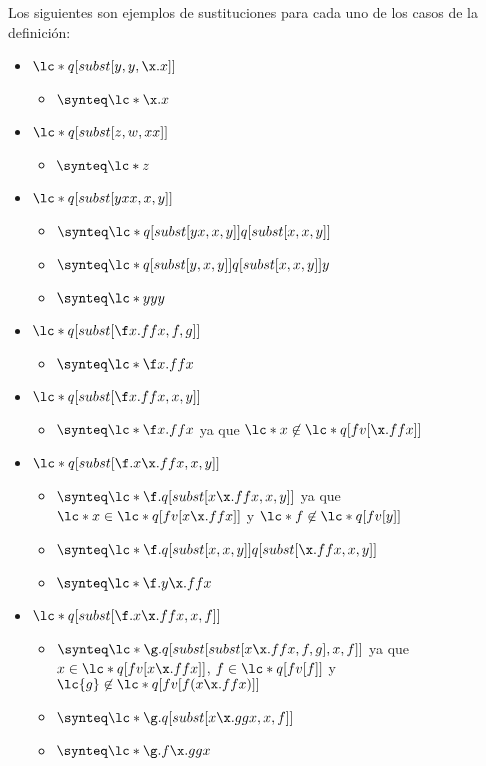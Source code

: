 Los siguientes son ejemplos de sustituciones para cada uno de los casos de la
definición:

\begin{itemize}
\item \(\lc*{q[subst[y,y,\x.x]]}\)
  \begin{itemize}
  \item \(\synteq \lc*{\x.x}\)
  \end{itemize}
\item \(\lc*{q[subst[z,w,x x]]}\)
  \begin{itemize}
  \item \(\synteq \lc*{z}\)
  \end{itemize}
\item \(\lc*{q[subst[y x x, x, y]]}\)
  \begin{itemize}
  \item \(\synteq \lc*{q[subst[y x, x, y]] q[subst[x, x, y]]}\)
  \item \(\synteq \lc*{q[subst[y, x, y]] q[subst[x, x, y]] y}\)
  \item \(\synteq \lc*{y y y}\)
  \end{itemize}
\item \(\lc*{q[subst[\f x.f f x, f, g]]}\)
  \begin{itemize}
  \item \(\synteq \lc*{\f x.f f x}\)
  \end{itemize}
\item \(\lc*{q[subst[\f x.f f x, x, y]]}\)
  \begin{itemize}
  \item \(\synteq \lc*{\f x.f f x}\) ya que \(\lc*{x} \not\in \lc*{q[fv[\x.f f x]]}\)
  \end{itemize}
\item \(\lc*{q[subst[\f.x\x.f f x, x, y]]}\)
  \begin{itemize}
  \item \(\synteq \lc*{\f.q[subst[x\x.f f x, x, y]]}\) ya que
    \(\lc*{x}\in\lc*{q[fv[x\x.f f x]]}\) y \(\lc*{f}\not\in \lc*{q[fv[y]]}\)
  \item \(\synteq \lc*{\f.q[subst[x,x,y]] q[subst[\x.f f x, x, y]]}\)
  \item \(\synteq \lc*{\f.y\x.f f x}\)
  \end{itemize}
\item \(\lc*{q[subst[\f.x\x.f f x, x, f]]}\)
  \begin{itemize}
  \item \(\synteq \lc*{\g.q[subst[subst[x\x.f f x, f, g], x, f]]}\) ya que
    \(x\in \lc*{q[fv[x\x.f f x]]}\), \(f\in \lc*{q[fv[f]]}\) y \(\lc{g}\not\in
    \lc*{q[fv[f (x\x.f f x)]]}\)
  \item \(\synteq \lc*{\g.q[subst[x\x.g g x, x, f]]}\)
  \item \(\synteq \lc*{\g.f\x.g g x}\)
  \end{itemize}
\end{itemize}

